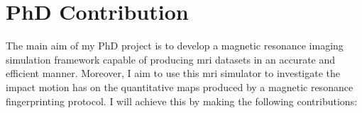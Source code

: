 \section{PhD Contribution}\label{chapterlabel1sec2}

The main aim of my PhD project is to develop a magnetic resonance imaging simulation framework capable of producing \ac{mri} datasets in an accurate and efficient manner.
Moreover, I aim to use this \ac{mri} simulator to investigate the impact motion 
has on the quantitative maps produced by a magnetic resonance fingerprinting protocol.
I will achieve this by making the following contributions:


